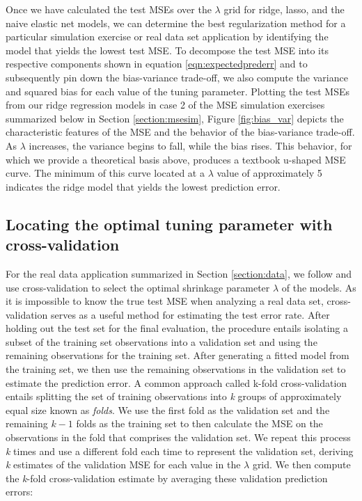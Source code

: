 \noindent Once we have calculated the test MSEs over the $\lambda$ grid for ridge, lasso, and the naive elastic net models, we can determine the best regularization method for a particular simulation exercise or real data set application by identifying the model that yields the lowest test MSE. To decompose the test MSE into its respective components shown in equation \eqref{eqn:expectedprederr} and to subsequently pin down the bias-variance trade-off, we also compute the variance and squared bias for each value of the tuning parameter. Plotting the test MSEs from our ridge regression models in case 2 of the MSE simulation exercises summarized below in Section \ref{section:msesim}, Figure \ref{fig:bias_var} depicts the characteristic features of the MSE and the behavior of the bias-variance trade-off. As $\lambda$ increases, the variance begins to fall, while the bias rises. This behavior, for which we provide a theoretical basis above, produces a textbook u-shaped MSE curve. The minimum of this curve located at a $\lambda$ value of approximately 5 indicates the ridge model that yields the lowest prediction error. 
    
\subsection{Locating the optimal tuning parameter with cross-validation}

\noindent For the real data application summarized in Section \ref{section:data}, we follow \cite{zou2005regularization} and use cross-validation to select the optimal shrinkage parameter $\lambda$ of the models. As it is impossible to know the true test MSE when analyzing a real data set, cross-validation serves as a useful method for estimating the test error rate. After holding out the test set for the final evaluation, the procedure entails isolating a subset of the training set observations into a validation set and using the remaining observations for the training set. After generating a fitted model from the training set, we then use the remaining observations in the validation set to estimate the prediction error. A common approach called k-fold cross-validation entails splitting the set of training observations into \textit{k} groups of approximately equal size known as \textit{folds}. We use the first fold as the validation set and the remaining $\textit{k} - 1$ folds as the training set to then calculate the MSE on the observations in the fold that comprises the validation set. We repeat this process \textit{k} times and use a different fold each time to represent the validation set, deriving \textit{k} estimates of the validation MSE for each value in the $\lambda$ grid. We then compute the \textit{k}-fold cross-validation estimate by averaging these validation prediction errors: 


